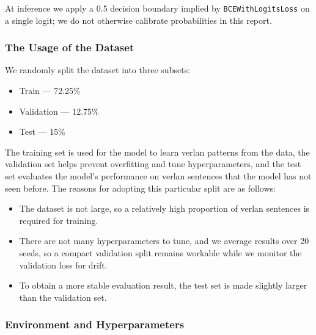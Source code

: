 \documentclass[12pt]{article}
\begin{document}
At inference we apply a 0.5 decision boundary implied by \texttt{BCEWithLogitsLoss} on a single logit; we do not otherwise calibrate probabilities in this report.

\subsubsection{The Usage of the Dataset}

We randomly split the dataset into three subsets:

\begin{itemize}
  \item Train --- 72.25\%
  \item Validation --- 12.75\%
  \item Test --- 15\%
\end{itemize}

The training set is used for the model to learn verlan patterns from the data, 
the validation set helps prevent overfitting and tune hyperparameters, 
and the test set evaluates the model's performance on verlan sentences that the model has not seen before.  
The reasons for adopting this particular split are as follows:

\begin{itemize}
  \item The dataset is not large, so a relatively high proportion of verlan sentences is required for training.
  \item There are not many hyperparameters to tune, and we average results over 20 seeds, so a compact validation split remains workable while we monitor the validation loss for drift.
  \item To obtain a more stable evaluation result, the test set is made slightly larger than the validation set.
\end{itemize}


\subsubsection{Environment and Hyperparameters}
\end{document}

